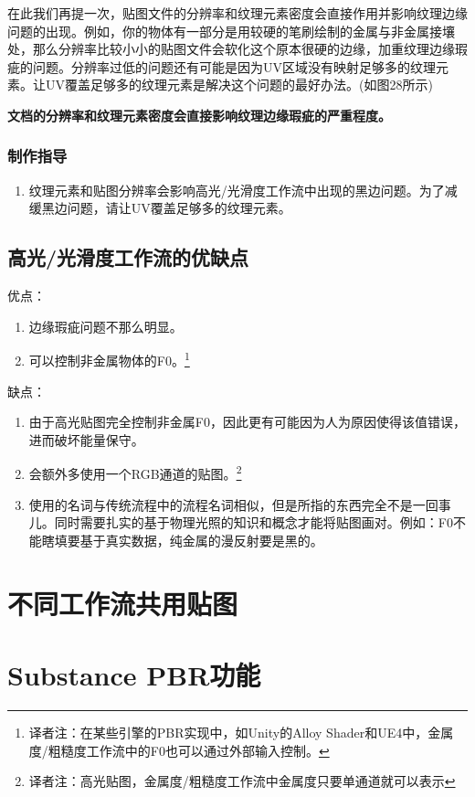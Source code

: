 在此我们再提一次，贴图文件的分辨率和纹理元素密度会直接作用并影响纹理边缘问题的出现。例如，你的物体有一部分是用较硬的笔刷绘制的金属与非金属接壤处，那么分辨率比较小小的贴图文件会软化这个原本很硬的边缘，加重纹理边缘瑕疵的问题。分辨率过低的问题还有可能是因为UV区域没有映射足够多的纹理元素。让UV覆盖足够多的纹理元素是解决这个问题的最好办法。(如图28所示)

\textbf{文档的分辨率和纹理元素密度会直接影响纹理边缘瑕疵的严重程度。}

\subsubsection{制作指导}

\begin{enumerate}
\item 纹理元素和贴图分辨率会影响高光/光滑度工作流中出现的黑边问题。为了减缓黑边问题，请让UV覆盖足够多的纹理元素。
\end{enumerate}

\subsection{高光/光滑度工作流的优缺点}

优点：

\begin{enumerate}
\item 边缘瑕疵问题不那么明显。
\item 可以控制非金属物体的F0。\footnote{译者注：在某些引擎的PBR实现中，如Unity的Alloy Shader和UE4中，金属度/粗糙度工作流中的F0也可以通过外部输入控制。}
\end{enumerate}

缺点：

\begin{enumerate}
\item 由于高光贴图完全控制非金属F0，因此更有可能因为人为原因使得该值错误，进而破坏能量保守。
\item 会额外多使用一个RGB通道的贴图。\footnote{译者注：高光贴图，金属度/粗糙度工作流中金属度只要单通道就可以表示}
\item 使用的名词与传统流程中的流程名词相似，但是所指的东西完全不是一回事儿。同时需要扎实的基于物理光照的知识和概念才能将贴图画对。例如：F0不能瞎填要基于真实数据，纯金属的漫反射要是黑的。
\end{enumerate}

\section{不同工作流共用贴图}
\label{sec:common_maps}

\section{Substance PBR功能}